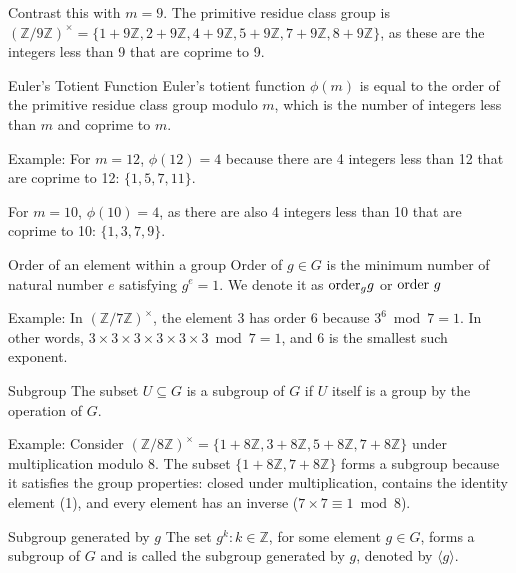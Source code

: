 \documentclass{article}
\begin{document}
Contrast this with $m = 9$. The primitive residue class group is $(\mathbb{Z}/9\mathbb{Z})^{\times} = \{1 + 9\mathbb{Z}, 2 + 9\mathbb{Z}, 4 + 9\mathbb{Z}, 5 + 9\mathbb{Z}, 7 + 9\mathbb{Z}, 8 + 9\mathbb{Z}\}$, as these are the integers less than 9 that are coprime to 9.


\begin{definition}{Euler's Totient Function}{}
Euler's totient function $\phi(m)$ is equal to the order of the primitive residue class group modulo $m$, which is the number of integers less than $m$ and coprime to $m$.
\end{definition}

Example: For $m = 12$, $\phi(12) = 4$ because there are 4 integers less than 12 that are coprime to 12: $\{1, 5, 7, 11\}$.

For $m = 10$, $\phi(10) = 4$, as there are also 4 integers less than 10 that are coprime to 10: $\{1, 3, 7, 9\}$.

\begin{definition}{Order of an element within a group}{}
    Order of $g \in G$ is the minimum number of natural number $e$ satisfying $g^{e} = 1$. We denote it as $\hbox{order}_g g$ or $\hbox{order } g$
\end{definition}

Example: In $(\mathbb{Z}/7\mathbb{Z})^{\times}$, the element 3 has order 6 because $3^6 \bmod 7 = 1$. In other words, $3 \times 3 \times 3 \times 3 \times 3 \times 3 \bmod 7 = 1$, and 6 is the smallest such exponent.

\begin{definition}{Subgroup}{}
    The subset $U \subseteq G$ is a subgroup of $G$ if $U$ itself is a group by the operation of $G$.
\end{definition}

Example: Consider $(\mathbb{Z}/8\mathbb{Z})^{\times} = \{1 + 8\mathbb{Z}, 3+ 8\mathbb{Z}, 5+ 8\mathbb{Z}, 7+ 8\mathbb{Z}\}$ under multiplication modulo 8. The subset $\{1+ 8\mathbb{Z}, 7+ 8\mathbb{Z}\}$ forms a subgroup because it satisfies the group properties: closed under multiplication, contains the identity element (1), and every element has an inverse ($7 \times 7 \equiv 1 \bmod 8$).

\begin{definition}{Subgroup generated by $g$}{} The set ${g^{k} : k \in \mathbb{Z}}$, for some element $g \in G$, forms a subgroup of $G$ and is called the subgroup generated by $g$, denoted by $\langle g \rangle$. \end{definition}
\end{document}
